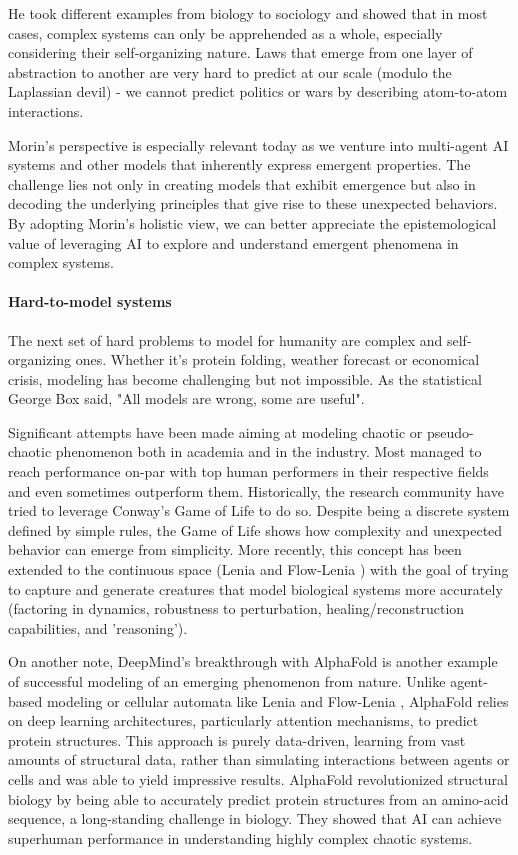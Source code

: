 \documentclass[11pt]{article}
\begin{document}
He took different examples from biology to sociology and showed that in most cases, complex systems can only be apprehended as a whole, especially considering their self-organizing nature. Laws that emerge from one layer of abstraction to another are very hard to predict at our scale (modulo the Laplassian devil) - we cannot predict politics or wars by describing atom-to-atom interactions. 

Morin's perspective is especially relevant today as we venture into multi-agent AI systems and other models that inherently express emergent properties. The challenge lies not only in creating models that exhibit emergence but also in decoding the underlying principles that give rise to these unexpected behaviors. By adopting Morin's holistic view, we can better appreciate the epistemological value of leveraging AI to explore and understand emergent phenomena in complex systems.

\paragraph{Hard-to-model systems}The next set of hard problems to model for humanity are complex and self-organizing ones. Whether it's protein folding, weather forecast or economical crisis, modeling has become challenging but not impossible. As the statistical George Box said, "All models are wrong, some are useful".

Significant attempts have been made aiming at modeling chaotic or pseudo-chaotic phenomenon both in academia and in the industry. Most managed to reach performance on-par with top human performers in their respective fields and even sometimes outperform them. 
Historically, the research community have tried to leverage Conway's Game of Life \cite{conway} to do so. Despite being a discrete system defined by simple rules, the Game of Life shows how complexity and unexpected behavior can emerge from simplicity. More recently, this concept has been extended to the continuous space (Lenia \cite{lenia} and Flow-Lenia \cite{flowlenia}) with the goal of trying to capture and generate creatures that model biological systems more accurately (factoring in dynamics, robustness to perturbation, healing/reconstruction capabilities, and 'reasoning').

On another note, DeepMind's breakthrough with AlphaFold \cite{alphafold} is another example of successful modeling of an emerging phenomenon from nature. Unlike agent-based modeling or cellular automata like Lenia \cite{lenia} and Flow-Lenia \cite{flowlenia}, AlphaFold relies on deep learning architectures, particularly attention mechanisms, to predict protein structures. This approach is purely data-driven, learning from vast amounts of structural data, rather than simulating interactions between agents or cells and was able to yield impressive results. AlphaFold revolutionized structural biology by being able to accurately predict protein structures from an amino-acid sequence, a long-standing challenge in biology. They showed that AI can achieve superhuman performance in understanding highly complex chaotic systems.
\end{document}
